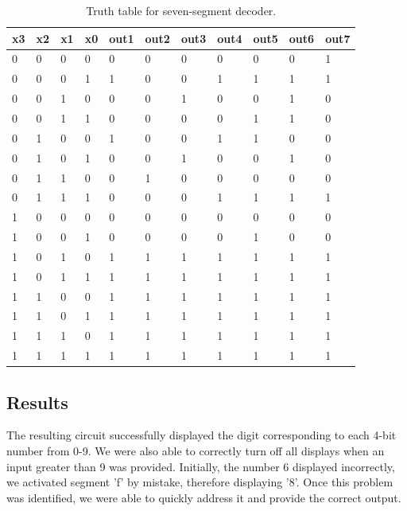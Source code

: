 \documentclass[11pt]{article}
\begin{document}
\begin{table}[h]
\begin{center}
	\begin{tabular}{| l | l | l | l | l | l | l | l | l | l | l |}
		\hline
		x3 & x2 & x1 & x0  & out1 & out2 & out3 & out4 & out5 & out6 & out7\\ \hline
		0 & 0 & 0 & 0 & 0 & 0 & 0 & 0 & 0 & 0 & 1 \\ \hline
		0 & 0 & 0 & 1 & 1 & 0 & 0 & 1 & 1 & 1 & 1 \\ \hline
		0 & 0 & 1 & 0 & 0 & 0 & 1 & 0 & 0 & 1 & 0 \\ \hline
		0 & 0 & 1 & 1 & 0 & 0 & 0 & 0 & 1 & 1 & 0 \\ \hline
		0 & 1 & 0 & 0 & 1 & 0 & 0 & 1 & 1 & 0 & 0 \\ \hline
		0 & 1 & 0 & 1 & 0 & 0 & 1 & 0 & 0 & 1 & 0 \\ \hline
		0 & 1 & 1 & 0 & 0 & 1 & 0 & 0 & 0 & 0 & 0 \\ \hline
		0 & 1 & 1 & 1 & 0 & 0 & 0 & 1 & 1 & 1 & 1 \\ \hline
		1 & 0 & 0 & 0 & 0 & 0 & 0 & 0 & 0 & 0 & 0 \\ \hline
		1 & 0 & 0 & 1 & 0 & 0 & 0 & 0 & 1 & 0 & 0 \\ \hline
		1 & 0 & 1 & 0 & 1 & 1 & 1 & 1 & 1 & 1 & 1 \\ \hline
		1 & 0 & 1 & 1 & 1 & 1 & 1 & 1 & 1 & 1 & 1 \\ \hline
		1 & 1 & 0 & 0 & 1 & 1 & 1 & 1 & 1 & 1 & 1 \\ \hline
		1 & 1 & 0 & 1 & 1 & 1 & 1 & 1 & 1 & 1 & 1 \\ \hline
		1 & 1 & 1 & 0 & 1 & 1 & 1 & 1 & 1 & 1 & 1 \\ \hline
		1 & 1 & 1 & 1 & 1 & 1 & 1 & 1 & 1 & 1 & 1 \\ \hline
	\end{tabular}
	\caption{\label{tab:table-name}Truth table for seven-segment decoder.}
	\label{tab:sevenSegTruthTable}
\end{center}
\end{table}

\subsection{Results}

The resulting circuit successfully displayed the digit corresponding to each 4-bit number from 0-9. We were also able to correctly turn off all displays when an input greater than 9 was provided. Initially, the number 6 displayed incorrectly, we activated segment 'f' by mistake, therefore displaying '8'. Once this problem was identified, we were able to quickly address it and provide the correct output.
\end{document}
